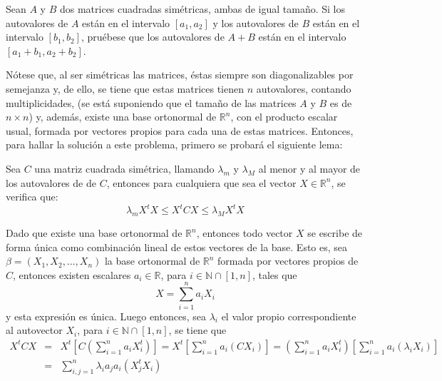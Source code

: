 \begin{enunciado}
 Sean $A$ y $B$ dos matrices cuadradas sim\'etricas, ambas de igual tama\~no.
 Si los autovalores de $A$ est\'an en el intervalo $[a_1, a_2]$ y los autovalores de $B$ est\'an en el intervalo $[b_1, b_2]$, pru\'ebese que los autovalores de $A+B$ est\'an en el intervalo $[a_1 + b_1, a_2 + b_2]$.
\end{enunciado}

\begin{solucion}
 N\'otese que, al ser sim\'etricas las matrices, \'estas siempre son diagonalizables por semejanza y, de ello, se tiene que estas matrices tienen $n$ autovalores, contando multiplicidades, (se est\'a suponiendo que el tama\~no de las matrices $A$ y $B$ es de $n\times n$) y, adem\'as, existe una base ortonormal de $\mathbb{R}^n$, con el producto escalar usual, formada por vectores propios para cada una de estas matrices. Entonces, para hallar la soluci\'on a este problema, primero se probar\'a el siguiente lema:
 \begin{lema}
  Sea $C$ una matriz cuadrada sim\'etrica, llamando $\lambda_m$ y $\lambda_M$ al menor y al mayor de los autovalores de de $C$, entonces para cualquiera que sea el vector $X\in \mathbb{R}^n$, se verifica que:
  \begin{equation*}
   \lambda_m X^tX \leq X^tCX \leq \lambda_M X^tX
  \end{equation*}
 \end{lema}
 \begin{demostracion}
  Dado que existe una base ortonormal de $\mathbb{R}^n$, entonces todo vector $X$ se escribe de forma \'unica como combinaci\'on lineal de estos vectores de la base. Esto es, sea $\beta = (X_1, X_2, \ldots, X_n)$ la base ortonormal de $\mathbb{R}^n$ formada por vectores propios de $C$, entonces existen escalares $a_i \in \mathbb{R}$, para $i \in \mathbb{N}\cap[1,n]$, tales que
  \begin{equation*}
   X = \sum_{i=1}^n a_i X_i
  \end{equation*}
  y esta expresi\'on es \'unica. Luego entonces, sea $\lambda_i$ el valor propio correspondiente al autovector $X_i$, para $i \in \mathbb{N}\cap[1,n]$, se tiene que
  \begin{eqnarray*}
   X^tCX & = & X^t \left[ C \left( \sum_{i=1}^n a_i X_i^t \right) \right] = X^t \left[ \sum_{i=1}^n a_i (CX_i) \right] = \left( \sum_{i=1}^n a_i X_i^t \right) \left[ \sum_{i=1}^n a_i (\lambda_i X_i) \right] \\
   & = & \sum_{i,j = 1}^n \lambda_i a_j a_i (X_j^tX_i)

\end{eqnarray*}
\end{demostracion}
\end{solucion}
